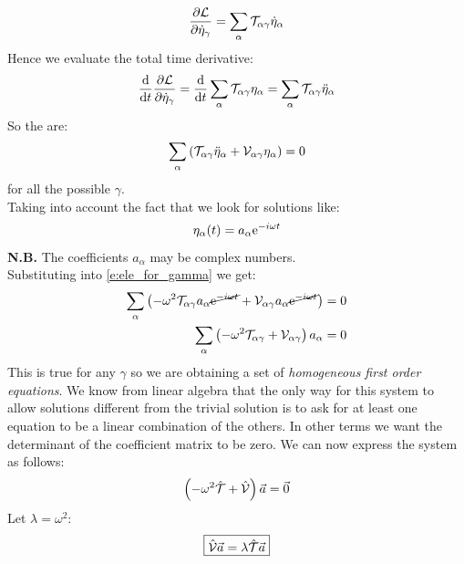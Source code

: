 \begin{equation}
    \pdv{\lagr}{\dot{\eta}_{\gamma}} = \bigsum_{\alpha}\Telegant_{\alpha \gamma} \dot{\eta}_{\alpha}
\end{equation}
Hence we evaluate the total time derivative:
\begin{equation}
    \dv{}{t}\pdv{\lagr}{\dot{\eta}_{\gamma}} = \dv{}{t}\bigsum_{\alpha}\Telegant_{\alpha \gamma} \eta_{\alpha} = \bigsum_{\alpha}\Telegant_{\alpha \gamma} \ddot{\eta}_{\alpha}
\end{equation}
So the \eleref\;are:
\begin{equation} \label{e:ele_for_gamma}
    \displaystyle\sum_{\alpha}\left(\mathcal{T}_{\alpha \gamma} \ddot{\eta}_{\alpha} + \mathcal{V}_{\alpha \gamma} \eta_{\alpha}\right) = 0
\end{equation}
for all the possible $\gamma$.\\
Taking into account the fact that we look for solutions like:
\begin{equation}
    \eta_{\alpha} (t) = a_{\alpha}\mathrm{e}^{-i\omega t}
\end{equation}
\textbf{N.B.} The coefficients $a_{\alpha}$ may be complex numbers.\\
Substituting into \eqref{e:ele_for_gamma} we get:
\begin{equation} \label{e:eigenvalue_alpha}
    \begin{split}
        \displaystyle\sum_{\alpha}\left(-\omega^2\mathcal{T}_{\alpha \gamma} a_{\alpha}\cancel{\mathrm{e}^{-i\omega t}} + \mathcal{V}_{\alpha \gamma}a_{\alpha}\cancel{\mathrm{e}^{-i\omega t}}\right) &= 0\\
        \displaystyle\sum_{\alpha}\left(-\omega^2\mathcal{T}_{\alpha \gamma} + \mathcal{V}_{\alpha \gamma}\right)a_{\alpha} &= 0
    \end{split}
\end{equation}
This is true for any $\gamma$ so we are obtaining a set of \textit{homogeneous first order equations}. We know from linear algebra that the only way for this system to allow solutions different from the trivial solution is to ask for at least one equation to be a linear combination of the others.
In other terms we want the determinant of the coefficient matrix to be zero. We can now express the system as follows:
\begin{equation}
    \left(-\omega^2\hat{\mathcal{T}} + \hat{\mathcal{V}}\right)\vec{a} = \vec{0}
\end{equation}
Let $\lambda = \omega^2$:
\begin{equation}
    \boxed{\hat{\mathcal{V}}\vec{a} = \lambda\hat{\mathcal{T}}\vec{a}}
\end{equation}
